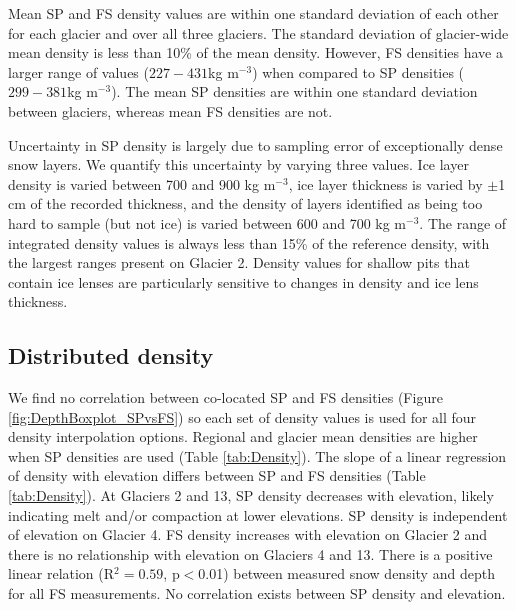 \documentclass[review,oneside, letterpaper]{igs}
\begin{document}
Mean SP and FS density values are within one standard deviation of each other for each glacier and over all three glaciers. The standard deviation of glacier-wide mean density is less than 10\% of the mean density. However, FS densities have a larger range of values ($227-431$kg m$^{-3}$) when compared to SP densities ($299-381$kg m$^{-3}$).  The mean SP densities are within one standard deviation between glaciers, whereas mean FS densities are not.

Uncertainty in SP density is largely due to sampling error of exceptionally dense snow layers. We quantify this uncertainty by varying three values. Ice layer density is varied between 700 and 900 kg m$^{-3}$, ice layer thickness is varied by $\pm$1 cm of the recorded thickness, and the density of layers identified as being too hard to sample (but not ice) is varied between 600 and 700 kg m$^{-3}$. The range of integrated density values is always less than 15\% of the reference density, with the largest ranges present on Glacier 2. Density values for shallow pits that contain ice lenses are particularly sensitive to changes in density and ice lens thickness.

\subsection{Distributed density}

We find no correlation between co-located SP and FS densities (Figure \ref{fig:DepthBoxplot_SPvsFS}) so each set of density values is used for all four density interpolation options. Regional and glacier mean densities are higher when SP densities are used (Table \ref{tab:Density}). The slope of a linear regression of density with elevation differs between SP and FS densities (Table \ref{tab:Density}). At Glaciers 2 and 13, SP density decreases with elevation, likely indicating melt and/or compaction at lower elevations. SP density is independent of elevation on Glacier 4. FS density increases with elevation on Glacier 2 and there is no relationship with elevation on Glaciers 4 and 13. There is a positive linear relation (R$^2= 0.59$, p$<$0.01) between measured snow density and depth for all FS measurements. No correlation exists between SP density and elevation.
\end{document}
